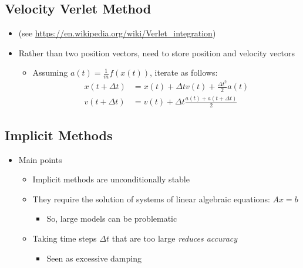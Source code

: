 \documentclass{article}
\begin{document}
\subsection*{Velocity Verlet Method}
\begin{itemize}
    \item (see \url{https://en.wikipedia.org/wiki/Verlet_integration})
    \item Rather than two position vectors, need to store position and velocity vectors
    \begin{itemize}
        \item Assuming $a(t) = \frac{1}{m} f(x(t))$, iterate as follows:
        \begin{align*}
            x(t + \Delta t) &= x(t) + \Delta t v(t) + \frac{\Delta t^2}{2} a(t)\\
            v(t + \Delta t) &= v(t) + \Delta t \frac{a(t) + a(t + \Delta t)}{2}
        \end{align*}
    \end{itemize}
\end{itemize}

\subsection*{Implicit Methods}
\begin{itemize}
    \item Main points
    \begin{itemize}
        \item Implicit methods are unconditionally stable
        \item They require the solution of systems of linear algebraic equations: $Ax = b$
        \begin{itemize}
            \item So, large models can be problematic
        \end{itemize}
        \item Taking time steps $\Delta t$ that are too large \textit{reduces accuracy}
        \begin{itemize}
            \item Seen as excessive damping
        \end{itemize}
    \end{itemize}
\end{itemize}
\end{document}
